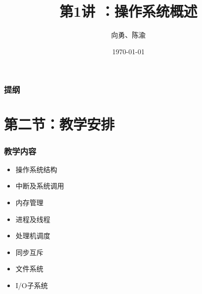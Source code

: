 \documentclass[UTF8]{ctexbeamer}
\title[第1讲]{第1讲 ：操作系统概述} %
\author{向勇、陈渝} %
\institute[清华大学] %
{
清华大学计算机系 \\ %
\medskip
\textit{xyong,yuchen@tsinghua.edu.cn} %
}
\date{\today} %
\begin{document}
\begin{frame}
\titlepage %
\end{frame}

\begin{frame}
\frametitle{提纲} %
\tableofcontents %
\end{frame}


\section{第二节：教学安排} %

\begin{frame}
	\frametitle{教学内容}
    \begin{itemize}
		\item 操作系统结构
		\item 中断及系统调用
		\item 内存管理
		\item 进程及线程
		\item 处理机调度
		\item 同步互斥
		\item 文件系统
		\item I/O子系统
    \end{itemize}
\end{frame}
\end{document}
